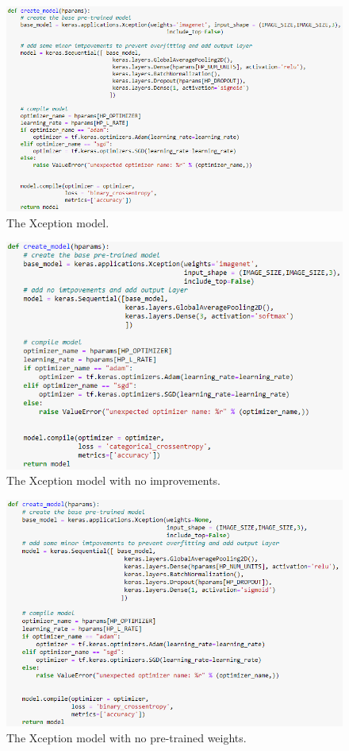 \begin{figure}[H]
    \centering
    \includegraphics[width=\textwidth]{figures/xception-model.png}
    \caption{The Xception model.}
    \label{fig:xception-model-final}
\end{figure}
\begin{figure}[H]
    \centering
    \includegraphics[width=\textwidth]{figures/xception-model-no-improv.png}
    \caption{The Xception model with no improvements.}
    \label{fig:xception-model-final-no-improv}
\end{figure}
\begin{figure}[H]
    \centering
    \includegraphics[width=\textwidth]{figures/xception-model-no-weights.png}
    \caption{The Xception model with no pre-trained weights.}
    \label{fig:xception-model-final-no-weights}
\end{figure}
